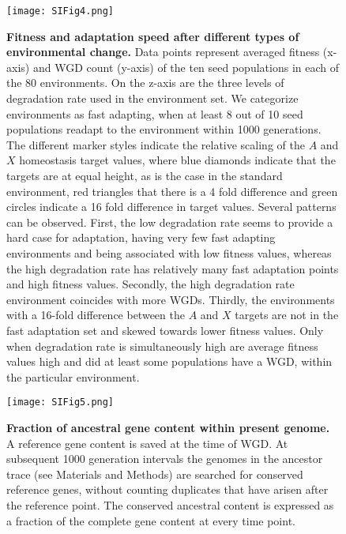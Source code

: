 \begin{figure}[htp]
 \begin{center}
 \texttt{[image: SIFig4.png]}
\end{center}
\caption{\textbf{Fitness and adaptation speed after different types of environmental change.} Data points represent averaged fitness (x-axis) and WGD count (y-axis) of the ten seed populations in each of the 80 environments. On the z-axis are the three levels of degradation rate used in the environment set. We categorize environments as fast adapting, when at least 8 out of 10 seed populations readapt to the environment within 1000 generations. The different marker styles indicate the relative scaling of the $A$ and $X$ homeostasis target values, where blue diamonds indicate that the targets are at equal height, as is the case in the standard environment, red triangles that there is a 4 fold difference and green circles indicate a 16 fold difference in target values. Several patterns can be observed. First, the low degradation rate seems to provide a hard case for adaptation, having very few fast adapting environments and being associated with low fitness values, whereas the high degradation rate has relatively many fast adaptation points and high fitness values. Secondly, the high degradation rate environment coincides with more WGDs. Thirdly, the environments with a 16-fold difference between the $A$ and $X$ targets are not in the fast adaptation set and skewed towards lower fitness values. Only when degradation rate is simultaneously high are average fitness values high and did at least some populations have a WGD, within the particular environment.}
\label{SI:fast_slow_adapt3d} 
\end{figure} 

\begin{figure}[htp]
 \begin{center}
 \texttt{[image: SIFig5.png]}
\end{center}
\caption{\textbf{Fraction of ancestral gene content within present genome.} A reference gene content is saved at the time of WGD. At subsequent 1000 generation intervals the genomes in the ancestor trace (see Materials and Methods) are searched for conserved reference genes, without counting duplicates that have arisen after the reference point. The conserved ancestral content is expressed as a fraction of the complete gene content at every time point.}
\label{SI:fraction_ancestral} 
\end{figure} 


